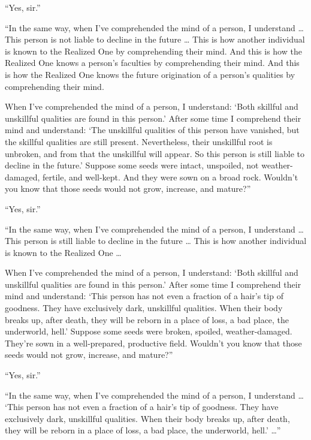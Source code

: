 \documentclass[12pt,openany]{book}%
\begin{document}
“Yes, sir.” 

“In the same way, when I’ve comprehended the mind of a person, I understand … This person is not liable to decline in the future … This is how another individual is known to the Realized One by comprehending their mind. And this is how the Realized One knows a person’s faculties by comprehending their mind. And this is how the Realized One knows the future origination of a person’s qualities by comprehending their mind. 

When I’ve comprehended the mind of a person, I understand: ‘Both skillful and unskillful qualities are found in this person.’ After some time I comprehend their mind and understand: ‘The unskillful qualities of this person have vanished, but the skillful qualities are still present. Nevertheless, their unskillful root is unbroken, and from that the unskillful will appear. So this person is still liable to decline in the future.’ Suppose some seeds were intact, unspoiled, not weather-damaged, fertile, and well-kept. And they were sown on a broad rock. Wouldn’t you know that those seeds would not grow, increase, and mature?” 

“Yes, sir.” 

“In the same way, when I’ve comprehended the mind of a person, I understand … This person is still liable to decline in the future … This is how another individual is known to the Realized One … 

When I’ve comprehended the mind of a person, I understand: ‘Both skillful and unskillful qualities are found in this person.’ After some time I comprehend their mind and understand: ‘This person has not even a fraction of a hair’s tip of goodness. They have exclusively dark, unskillful qualities. When their body breaks up, after death, they will be reborn in a place of loss, a bad place, the underworld, hell.’ Suppose some seeds were broken, spoiled, weather-damaged. They’re sown in a well-prepared, productive field. Wouldn’t you know that those seeds would not grow, increase, and mature?” 

“Yes, sir.” 

“In the same way, when I’ve comprehended the mind of a person, I understand … ‘This person has not even a fraction of a hair’s tip of goodness. They have exclusively dark, unskillful qualities. When their body breaks up, after death, they will be reborn in a place of loss, a bad place, the underworld, hell.’ …” 
\end{document}
